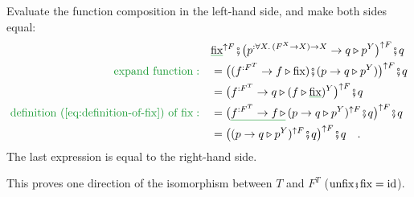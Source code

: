 Evaluate the function composition in the left-hand side, and make
both sides equal:
\begin{align*}
 & \gunderline{\text{fix}}^{\uparrow F}\bef\big(p^{:\forall X.\,(F^{X}\rightarrow X)\rightarrow X}\rightarrow q\triangleright p^{Y}\big)^{\uparrow F}\bef q\\
{\color{greenunder}\text{expand function}:}\quad & =\big((f^{:F^{T}}\rightarrow f\triangleright\text{fix})\bef(p\rightarrow q\triangleright p^{Y})\big)^{\uparrow F}\bef q\\
 & =\big(f^{:F^{T}}\rightarrow q\triangleright(f\triangleright\gunderline{\text{fix}})^{Y}\big)^{\uparrow F}\bef q\\
{\color{greenunder}\text{definition (\ref{eq:definition-of-fix}) of }\text{fix}:}\quad & =\big(\gunderline{f^{:F^{T}}\rightarrow f\,\triangleright}\,(p\rightarrow q\triangleright p^{Y})^{\uparrow F}\bef q\big)^{\uparrow F}\bef q\\
 & =\big((p\rightarrow q\triangleright p^{Y})^{\uparrow F}\bef q\big)^{\uparrow F}\bef q\quad.
\end{align*}
The last expression is equal to the right-hand side.

This proves one direction of the isomorphism between $T$ and $F^{T}$
($\text{unfix}\bef\text{fix}=\text{id}$).

